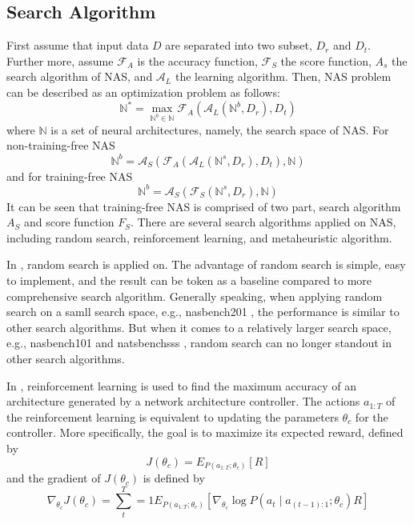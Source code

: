 \documentclass[sigconf]{acmart}
\begin{document}
    \subsection{Search Algorithm}
    First assume that input data $D$ are separated into two subset, $D_r$ and $D_t$. Further more, 
    assume $\mathcal F_A$ is the accuracy function, $\mathcal F_S$ the score function, $A_s$ the 
    search algorithm of NAS, and $\mathcal A_L$ the learning algorithm. Then, NAS problem can be 
    described as an optimization problem as follows: 
    \begin{equation}
        \label{equ:nas}
        \mathbb N^*=\max_{\mathbb N^b\in\mathbb N}\mathcal F_A(\mathcal A_L(\mathbb N^b, D_r), D_t)
    \end{equation}
    where $\mathbb N$ is a set of neural architectures, namely, the search space of NAS. 
    For non-training-free NAS 
    \begin{equation}
        \label{equ:non-training_free_nas}
        \mathbb N^b=\mathcal A_S(\mathcal F_A(\mathcal A_L(\mathbb N^s, D_r), D_t), \mathbb N)
    \end{equation}
    and for training-free NAS 
    \begin{equation}
        \label{equ:training_free_nas}
        \mathbb N^b=\mathcal A_S(\mathcal F_S(\mathbb N^s, D_r), \mathbb N)
    \end{equation}
    It can be seen that training-free NAS is comprised of two part, search algorithm $A_S$ and score 
    function $F_S$. 
    There are several search algorithms applied on NAS, including random search, reinforcement learning, and
    metaheuristic algorithm. 
    
    In \cite{https://doi.org/10.48550/arxiv.2006.04647} \cite{Lopes_2021}, random search is applied on. 
    The advantage of random search is simple, easy to implement, and the result can be token as a 
    baseline compared to more comprehensive search algorithm. Generally speaking, when applying random 
    search on a samll search space, e.g., nasbench201 \cite{dong2020nasbench201}, the performance is 
    similar to other search algorithms. But when it comes to a relatively larger search space, e.g., nasbench101 
    \cite{ying2019nasbench101} and natsbenchsss \cite{Dong_2021}, random search can no longer standout 
    in other search algorithms. 

    In \cite{zoph2017neural}, reinforcement learning is used to find the maximum accuracy of an architecture 
    generated by a network architecture controller. The actions $a_{1:T}$ of the reinforcement learning is 
    equivalent to updating the parameters $\theta_c$ for the controller. More specifically, the goal is to maximize 
    its expected reward, defined by 
    \begin{equation}
        \label{equ:reinforcement_rw}
        J(\theta_c)=E_{P(a_{1:T};\theta_c)}[R]
    \end{equation}
    and the gradient of $J(\theta_c)$ is defined by
    \begin{equation}
        \label{equ:reinforcement_grad}
        \nabla_{\theta_c} J(\theta_c)=\sum^T_t=1 E_{P(a_{1:T};\theta_c)}[\nabla_{\theta_c}\log P(a_t\mid a_{(t-1):1};\theta_c)R]
    \end{equation}
\end{document}
